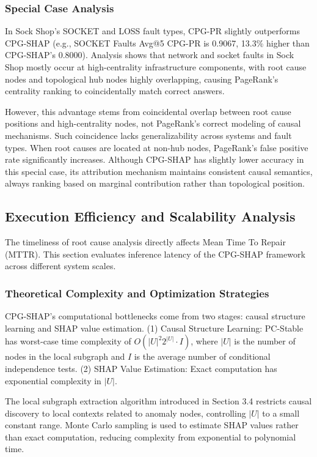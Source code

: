 \documentclass[conference]{IEEEtran}
\begin{document}
\subsubsection{Special Case Analysis}

In Sock Shop's SOCKET and LOSS fault types, CPG-PR slightly outperforms CPG-SHAP (e.g., SOCKET Faults Avg@5 CPG-PR is 0.9067, 13.3\% higher than CPG-SHAP's 0.8000). Analysis shows that network and socket faults in Sock Shop mostly occur at high-centrality infrastructure components, with root cause nodes and topological hub nodes highly overlapping, causing PageRank's centrality ranking to coincidentally match correct answers.

However, this advantage stems from coincidental overlap between root cause positions and high-centrality nodes, not PageRank's correct modeling of causal mechanisms. Such coincidence lacks generalizability across systems and fault types. When root causes are located at non-hub nodes, PageRank's false positive rate significantly increases. Although CPG-SHAP has slightly lower accuracy in this special case, its attribution mechanism maintains consistent causal semantics, always ranking based on marginal contribution rather than topological position.

\subsection{Execution Efficiency and Scalability Analysis}

The timeliness of root cause analysis directly affects Mean Time To Repair (MTTR). This section evaluates inference latency of the CPG-SHAP framework across different system scales.

\subsubsection{Theoretical Complexity and Optimization Strategies}

CPG-SHAP's computational bottlenecks come from two stages: causal structure learning and SHAP value estimation. (1) Causal Structure Learning: PC-Stable \cite{pcstable} has worst-case time complexity of $O(|U|^2 2^{|U|} \cdot I)$, where $|U|$ is the number of nodes in the local subgraph and $I$ is the average number of conditional independence tests. (2) SHAP Value Estimation: Exact computation has exponential complexity in $|U|$.

The local subgraph extraction algorithm introduced in Section 3.4 restricts causal discovery to local contexts related to anomaly nodes, controlling $|U|$ to a small constant range. Monte Carlo sampling is used to estimate SHAP values rather than exact computation, reducing complexity from exponential to polynomial time.
\end{document}
